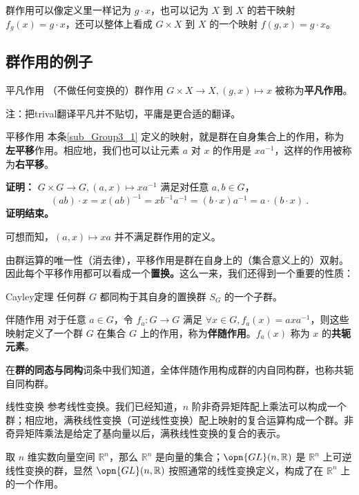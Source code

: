 群作用可以像定义里一样记为 $g\cdot x$，也可以记为 $X$ 到 $X$ 的若干映射 $f_g(x)=g\cdot x$，还可以整体上看成 $G\times X$ 到 $X$ 的一个映射 $f(g, x)=g\cdot x$。

\subsection{群作用的例子}

\begin{example}{平凡作用}\label{ex_Group3_5}
（不做任何变换的）群作用 $G \times X \to X, (g, x) \mapsto x$ 被称为\textbf{平凡作用}。
\end{example}

注：把trival翻译平凡并不贴切，平庸是更合适的翻译。%

\begin{example}{平移作用}\label{ex_Group3_1}
本条\autoref{sub_Group3_1} 定义的映射，就是群在自身集合上的作用，称为\textbf{左平移}作用。相应地，我们也可以让元素 $a$ 对 $x$ 的作用是 $x a^{-1}$，这样的作用被称为\textbf{右平移}。
\end{example}

\textbf{证明：} $G \times G \to G, (a, x) \mapsto x a^{-1}$ 满足对任意 $a, b \in G$，
\begin{equation}
(a b) \cdot x = x (a b)^{-1} = x b^{-1} a^{-1} = (b \cdot x) a^{-1} = a \cdot (b \cdot x) ~.
\end{equation}
\textbf{证明结束。}

可想而知，$(a, x) \mapsto x a$ 并不满足群作用的定义。


由群运算的唯一性（消去律），平移作用是群在自身上的（集合意义上的）双射。因此每个平移作用都可以看成一个\textbf{置换。}这么一来，我们还得到一个重要的性质：

\begin{theorem}{Cayley定理}\label{the_Group3_3}
任何群 $G$ 都同构于其自身的置换群 $S_G$ 的一个子群。
\end{theorem}

\begin{example}{伴随作用}\label{ex_Group3_2}
对于任意 $a\in G$，令 $f_a: G\rightarrow G$ 满足 $\forall x\in G, f_a(x)=axa^{-1}$，则这些映射定义了一个群 $G$ 在集合 $G$ 上的作用，称为\textbf{伴随作用}。$f_a(x)$ 称为 $x$ 的\textbf{共轭元素}。

在\textbf{群的同态与同构}词条中我们知道，全体伴随作用构成群的内自同构群，也称共轭自同构群。
\end{example}

\begin{example}{线性变换}\label{ex_Group3_3}
参考线性变换。我们已经知道，$n$ 阶非奇异矩阵配上乘法可以构成一个群；相应地，满秩线性变换（可逆线性变换）配上映射的复合运算构成一个群。非奇异矩阵乘法是给定了基向量以后，满秩线性变换的复合的表示。

取 $n$ 维实数向量空间 $\mathbb{R}^n$，那么 $\mathbb{R}^n$ 是向量的集合；$\opn{GL}(n,\mathbb{R})$ 是 $\mathbb{R}^n$ 上可逆线性变换的群，显然 $\opn{GL}(n,\mathbb{R})$ 按照通常的线性变换定义，构成了在 $\mathbb{R}^n$ 上的一个作用。
\end{example}


